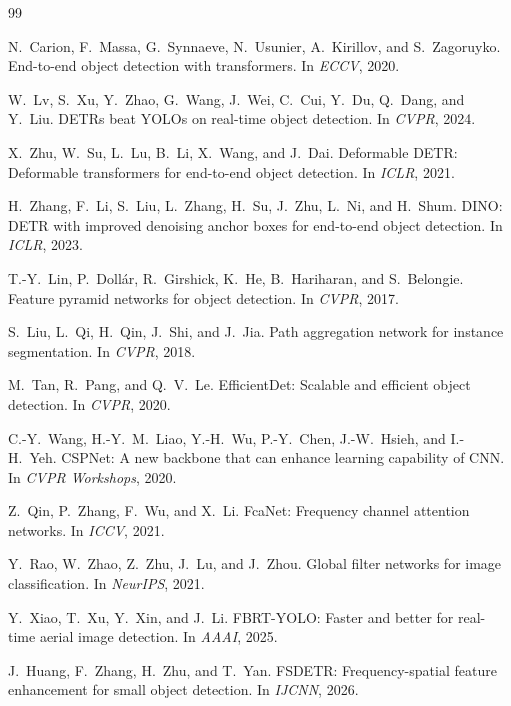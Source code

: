 \documentclass[10pt,twocolumn]{IEEEtran}
\begin{document}
\begin{thebibliography}{99}

N.~Carion, F.~Massa, G.~Synnaeve, N.~Usunier, A.~Kirillov, and S.~Zagoruyko.
End-to-end object detection with transformers.
In \emph{ECCV}, 2020.

W.~Lv, S.~Xu, Y.~Zhao, G.~Wang, J.~Wei, C.~Cui, Y.~Du, Q.~Dang, and Y.~Liu.
DETRs beat YOLOs on real-time object detection.
In \emph{CVPR}, 2024.

X.~Zhu, W.~Su, L.~Lu, B.~Li, X.~Wang, and J.~Dai.
Deformable DETR: Deformable transformers for end-to-end object detection.
In \emph{ICLR}, 2021.

H.~Zhang, F.~Li, S.~Liu, L.~Zhang, H.~Su, J.~Zhu, L.~Ni, and H.~Shum.
DINO: DETR with improved denoising anchor boxes for end-to-end object detection.
In \emph{ICLR}, 2023.

T.-Y.~Lin, P.~Doll\'ar, R.~Girshick, K.~He, B.~Hariharan, and S.~Belongie.
Feature pyramid networks for object detection.
In \emph{CVPR}, 2017.

S.~Liu, L.~Qi, H.~Qin, J.~Shi, and J.~Jia.
Path aggregation network for instance segmentation.
In \emph{CVPR}, 2018.

M.~Tan, R.~Pang, and Q.~V.~Le.
EfficientDet: Scalable and efficient object detection.
In \emph{CVPR}, 2020.

C.-Y.~Wang, H.-Y.~M.~Liao, Y.-H.~Wu, P.-Y.~Chen, J.-W.~Hsieh, and I.-H.~Yeh.
CSPNet: A new backbone that can enhance learning capability of CNN.
In \emph{CVPR Workshops}, 2020.

Z.~Qin, P.~Zhang, F.~Wu, and X.~Li.
FcaNet: Frequency channel attention networks.
In \emph{ICCV}, 2021.

Y.~Rao, W.~Zhao, Z.~Zhu, J.~Lu, and J.~Zhou.
Global filter networks for image classification.
In \emph{NeurIPS}, 2021.

Y.~Xiao, T.~Xu, Y.~Xin, and J.~Li.
FBRT-YOLO: Faster and better for real-time aerial image detection.
In \emph{AAAI}, 2025.

J.~Huang, F.~Zhang, H.~Zhu, and T.~Yan.
FSDETR: Frequency-spatial feature enhancement for small object detection.
In \emph{IJCNN}, 2026.


\end{thebibliography}
\end{document}
